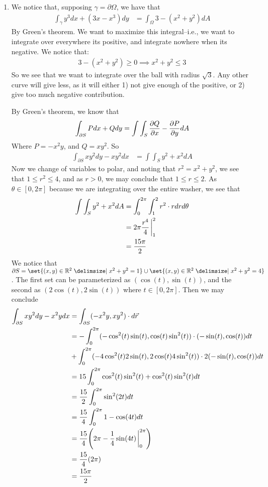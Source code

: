 \documentclass[12pt]{article}
\theoremstyle{definition}
\theoremstyle{remark}
\newcommand{\R}{\mathbb{R}}
\begin{document}
\begin{enumerate}[leftmargin=\labelsep]
		
		\newpage
		
		\item We notice that, supposing $\gamma = \partial \Omega$, we have that
		\begin{align*}
			\int_{\gamma} y^3 dx + (3x-x^3)dy &= \int_\Omega 3-(x^2+y^2)dA
		\end{align*}
		By Green's theorem. We want to maximize this integral--i.e., we want to integrate over everywhere its positive, and integrate nowhere when its negative. We notice that:
		\begin{align*}
			3-(x^2+y^2) \geq 0 \implies x^2+y^2 \leq 3
		\end{align*}
		So we see that we want to integrate over the ball with radius $\sqrt{3}$. Any other curve will give less, as it will either 1) not give enough of the positive, or 2) give too much negative contribution.
		
		By Green's theorem, we know that
		\begin{align*}
			\int_{\partial S} Pdx + Qdy = \int \int_S \pdv{Q}{x} - \pdv{P}{y}dA
		\end{align*}
		Where $P = -x^2y$, and $Q =xy^2$. 
		So 
		\begin{align*}
			\int_{\partial S} xy^2dy - xy^2dx &= \int\int_S y^2 + x^2dA
		\end{align*}
		Now we change of variables to polar, and noting that $r^2 = x^2+y^2$, we see that $1 \leq r^2 \leq 4$, and as $r > 0$, we may conclude that $1 \leq r \leq 2$. As $\theta \in [0, 2\pi]$ because we are integrating over the entire washer, we see that
		\begin{align*}
			\int\int_S y^2 + x^2dA &= \int_0^{2\pi} \int_1^2 r^2 \cdot r drd\theta \\
			&= 2\pi \frac{r^4}4 \eval_1^2 \\
			&= \frac{15\pi}{2}
		\end{align*}
		We notice that $\partial S = \set{(x, y) \in \R^2 \given x^2+y^2 = 1} \cup \set{(x, y) \in \R^2 \given x^2+y^2=4}$. The first set can be parameterized as $(\cos(t), \sin(t))$, and the second as $(2\cos(t), 2\sin(t))$ where $t \in [0, 2\pi]$. Then we may conclude 
		\begin{align*}
			\int_{\partial S} xy^2dy - x^2ydx &= \int_{\partial S} (-x^2y, xy^2) \cdot d\vec{r} \\
			&= -\int_0^{2\pi} (-\cos^2(t)\sin(t), \cos(t)\sin^2(t)) \cdot (-\sin(t), \cos(t)) dt  \\ &+\int_0^{2\pi} (-4\cos^2(t)2\sin(t), 2\cos(t)4\sin^2(t)) \cdot 2(-\sin(t), \cos(t)) dt \\
			&= 15 \int_0^{2\pi} \cos^2(t)\sin^2(t)+\cos^2(t)\sin^2(t)dt \\
			&= \frac{15}2 \int_0^{2\pi} \sin^2(2t)dt \\
			&= \frac{15}4 \int_0^{2\pi} 1 - \cos(4t)dt \\
			&= \frac{15}4 \qty(2\pi - \frac14 \sin(4t)\eval_0^{2\pi}) \\
			&= \frac {15}4 \qty(2\pi) \\
			&= \frac{15\pi}{2}
		\end{align*}
		\end{enumerate}
\end{document}
